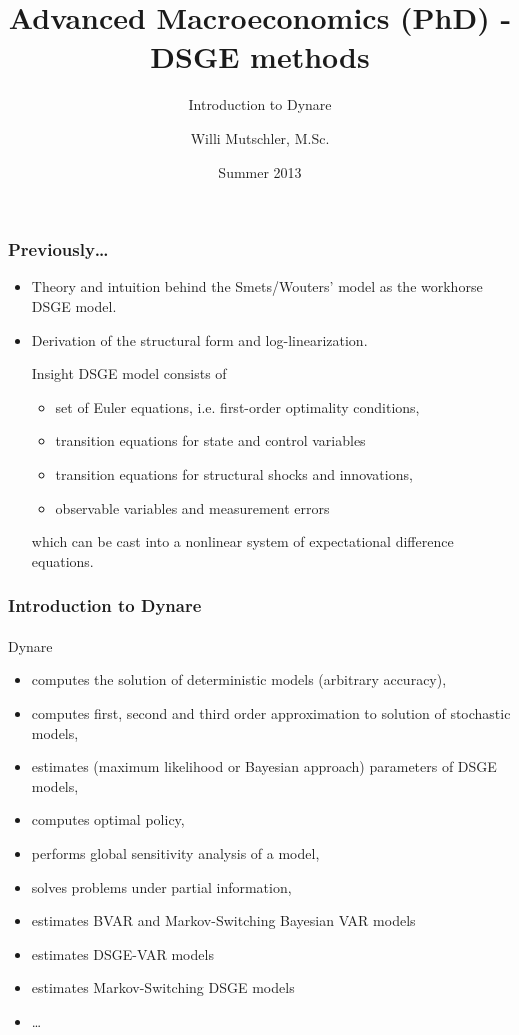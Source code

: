 \documentclass[handout]{beamer}  %
\begin{document}
\author[Willi Mutschler]{Willi Mutschler, M.Sc.}
\date{Summer 2013}
\title[DSGE methods]{Advanced Macroeconomics (PhD) - DSGE methods}
\subtitle{Introduction to Dynare}

\begin{frame}
\titlepage
\end{frame}

\begin{frame}\frametitle{Previously\dots}
\begin{itemize}[<+->]
  \item Theory and intuition behind the Smets/Wouters' model as the workhorse DSGE model.
  \item Derivation of the structural form and log-linearization.
\begin{block}{Insight}
DSGE model consists of
\begin{itemize}
     \item set of Euler equations, i.e. first-order optimality conditions,
     \item transition equations for state and control variables
     \item transition equations for structural shocks and innovations,
     \item observable variables and measurement errors
\end{itemize}
which can be cast into a nonlinear system of expectational difference equations.
\end{block}
\end{itemize}
\end{frame}

\begin{frame}
\frametitle{Introduction to Dynare}\framesubtitle{}
Dynare
\begin{itemize}
  \item computes the solution of deterministic models (arbitrary accuracy),
  \item computes first, second and third order approximation to solution of stochastic models,
  \item estimates (maximum likelihood or Bayesian approach) parameters of DSGE models,
  \item computes optimal policy,
  \item performs global sensitivity analysis of a model,
  \item solves problems under partial information,
  \item estimates BVAR and Markov-Switching Bayesian VAR models
  \item estimates DSGE-VAR models
  \item estimates Markov-Switching DSGE models
  \item \dots
\end{itemize}
\end{frame}
\end{document}
